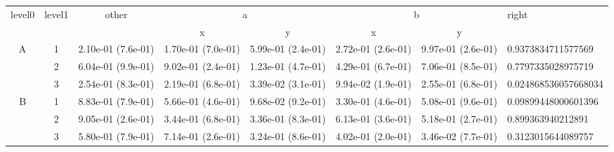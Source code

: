 \begin{tabular}{cccccccl}
\toprule
\multirow{2}{*}{level0} & \multirow{2}{*}{level1}& \multirow{2}{*}{other}&\multicolumn{2}{c}{a}&\multicolumn{2}{c}{b}& \multirow{2}{*}{right}\tabularnewline
\cmidrule(lr){4-5}
\cmidrule(lr){6-7}
&&&x&y&x&y\tabularnewline
\midrule
\multirow{3}{*}{A}&1& 2.10e-01 (7.6e-01)& 1.70e-01 (7.0e-01)& 5.99e-01 (2.4e-01)& 2.72e-01 (2.6e-01)& 9.97e-01 (2.6e-01)& 0.9373834711577569\tabularnewline
&2& 6.04e-01 (9.9e-01)& 9.02e-01 (2.4e-01)& 1.23e-01 (4.7e-01)& 4.29e-01 (6.7e-01)& 7.06e-01 (8.5e-01)& 0.7797335028975719\tabularnewline
&3& 2.54e-01 (8.3e-01)& 2.19e-01 (6.8e-01)& 3.39e-02 (3.1e-01)& 9.94e-02 (1.9e-01)& 2.55e-01 (6.8e-01)& 0.024868536057668034\tabularnewline
\midrule
\multirow{3}{*}{B}&1& 8.83e-01 (7.9e-01)& 5.66e-01 (4.6e-01)& 9.68e-02 (9.2e-01)& 3.30e-01 (4.6e-01)& 5.08e-01 (9.6e-01)& 0.09899448000601396\tabularnewline
&2& 9.05e-01 (2.6e-01)& 3.44e-01 (6.8e-01)& 3.36e-01 (8.3e-01)& 6.13e-01 (3.6e-01)& 5.18e-01 (2.7e-01)& 0.899363940212891\tabularnewline
&3& 5.80e-01 (7.9e-01)& 7.14e-01 (2.6e-01)& 3.24e-01 (8.6e-01)& 4.02e-01 (2.0e-01)& 3.46e-02 (7.7e-01)& 0.3123015644089757\tabularnewline
\bottomrule
\end{tabular}
